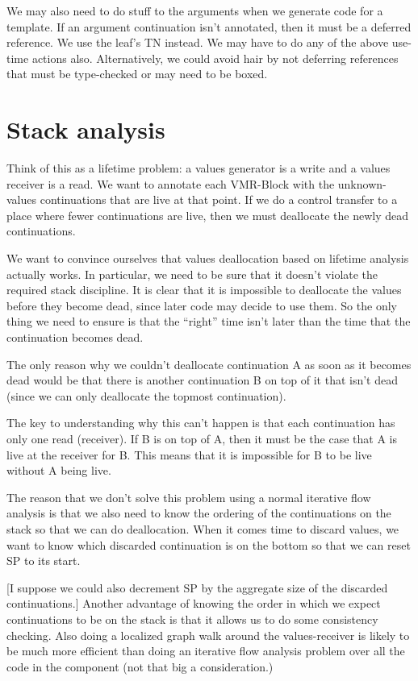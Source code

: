 We may also need to do stuff to the arguments when we generate code for a
template.  If an argument continuation isn't annotated, then it must be a
deferred reference.  We use the leaf's TN instead.  We may have to do any of
the above use-time actions also.  Alternatively, we could avoid hair by not
deferring references that must be type-checked or may need to be boxed.

\section{Stack analysis}

Think of this as a lifetime problem: a values generator is a write and a values
receiver is a read.  We want to annotate each VMR-Block with the unknown-values
continuations that are live at that point.  If we do a control transfer to a
place where fewer continuations are live, then we must deallocate the newly
dead continuations.

We want to convince ourselves that values deallocation based on lifetime
analysis actually works.  In particular, we need to be sure that it doesn't
violate the required stack discipline.  It is clear that it is impossible to
deallocate the values before they become dead, since later code may decide to
use them.  So the only thing we need to ensure is that the ``right'' time isn't
later than the time that the continuation becomes dead.

The only reason why we couldn't deallocate continuation A as soon as it becomes
dead would be that there is another continuation B on top of it that isn't dead
(since we can only deallocate the topmost continuation).

The key to understanding why this can't happen is that each continuation has
only one read (receiver).  If B is on top of A, then it must be the case that A
is live at the receiver for B.  This means that it is impossible for B to be
live without A being live.


The reason that we don't solve this problem using a normal iterative flow
analysis is that we also need to know the ordering of the continuations on the
stack so that we can do deallocation.  When it comes time to discard values, we
want to know which discarded continuation is on the bottom so that we can reset
SP to its start.  

[I suppose we could also decrement SP by the aggregate size of the discarded
continuations.]  Another advantage of knowing the order in which we expect
continuations to be on the stack is that it allows us to do some consistency
checking.  Also doing a localized graph walk around the values-receiver is
likely to be much more efficient than doing an iterative flow analysis problem
over all the code in the component (not that big a consideration.)



